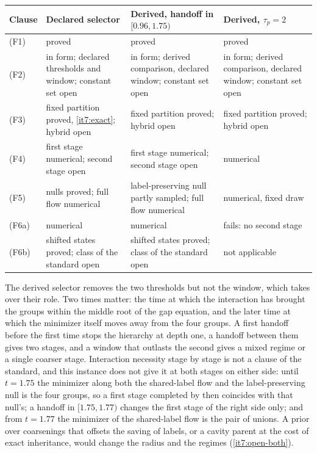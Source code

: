 \documentclass[11pt,letterpaper]{report}
\begin{document}
\begin{center}
\small
\begin{tabular}{>{\raggedright\arraybackslash}p{}>{\raggedright\arraybackslash}p{}>{\raggedright\arraybackslash}p{}>{\raggedright\arraybackslash}p{}}
\hline
Clause & Declared selector & Derived, handoff in $[0.96,1.75)$ & Derived, $\tau_p=2$\\
\hline
(F1) & proved & proved & proved\\
(F2) & in form; declared thresholds and window; constant set open & in form; derived comparison, declared window; constant set open & in form; derived comparison, declared window; constant set open\\
(F3) & fixed partition proved, \cref{it7:exact}; hybrid open & fixed partition proved; hybrid open & fixed partition proved; hybrid open\\
(F4) & first stage numerical; second stage open & first stage numerical; second stage open & numerical\\
(F5) & nulls proved; full flow numerical & label-preserving null partly sampled; full flow numerical & numerical, fixed draw\\
(F6a) & numerical & numerical & fails: no second stage\\
(F6b) & shifted states proved; class of the standard open & shifted states proved; class of the standard open & not applicable\\
\hline
\end{tabular}
\end{center}

The derived selector removes the two thresholds but not the window, which takes over their role. Two times matter: the time at which the interaction has brought the groups within the middle root of the gap equation, and the later time at which the minimizer itself moves away from the four groups. A first handoff before the first time stops the hierarchy at depth one, a handoff between them gives two stages, and a window that outlasts the second gives a mixed regime or a single coarser stage. Interaction necessity stage by stage is not a clause of the standard, and this instance does not give it at both stages on either side: until $t=1.75$ the minimizer along both the shared-label flow and the label-preserving null is the four groups, so a first stage completed by then coincides with that null's; a handoff in $[1.75,1.77)$ changes the first stage of the right side only; and from $t=1.77$ the minimizer of the shared-label flow is the pair of unions. A prior over coarsenings that offsets the saving of labels, or a cavity parent at the cost of exact inheritance, would change the radius and the regimes (\cref{it7:open-both}).
\end{document}
